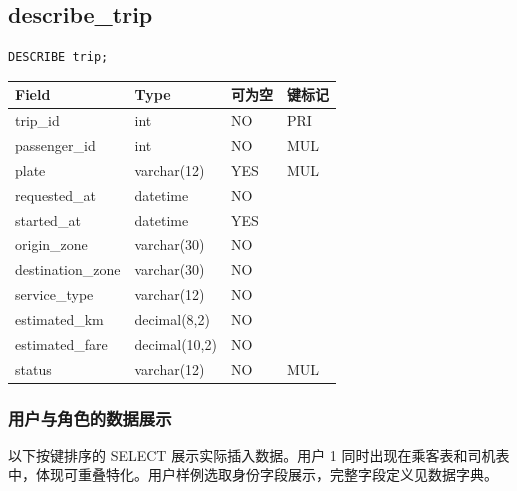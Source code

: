 \documentclass[11pt,a4paper]{article}
\begin{document}
\begin{minipage}[t]{.68\linewidth}
\begin{minipage}{\linewidth}
\subsection*{describe\_\allowbreak{}trip}
\begin{lstlisting}
DESCRIBE trip;
\end{lstlisting}
\par\begingroup\small\noindent
\begin{tabularx}{\linewidth}{YYYY}
\toprule
Field & Type & 可为空 & 键标记\\\midrule
trip\_\allowbreak{}id & int & NO & PRI\\
passenger\_\allowbreak{}id & int & NO & MUL\\
plate & varchar(12) & YES & MUL\\
requested\_\allowbreak{}at & datetime & NO & \\
started\_\allowbreak{}at & datetime & YES & \\
origin\_\allowbreak{}zone & varchar(30) & NO & \\
destination\_\allowbreak{}zone & varchar(30) & NO & \\
service\_\allowbreak{}type & varchar(12) & NO & \\
estimated\_\allowbreak{}km & decimal(8,2) & NO & \\
estimated\_\allowbreak{}fare & decimal(10,2) & NO & \\
status & varchar(12) & NO & MUL\\
\bottomrule
\end{tabularx}
\par\endgroup
\end{minipage}\par\vspace{5pt}
\end{minipage}
\subsubsection*{用户与角色的数据展示}
以下按键排序的 SELECT 展示实际插入数据。用户 1 同时出现在乘客表和司机表中，体现可重叠特化。用户样例选取身份字段展示，完整字段定义见数据字典。
\end{document}
